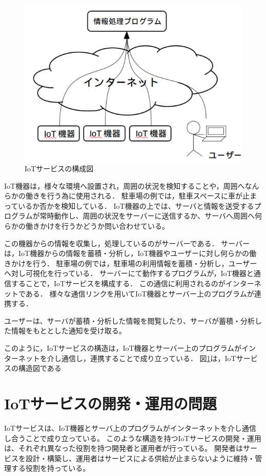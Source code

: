 \begin{figure}[htbp]
\includegraphics[width=14cm]{images/IoTservice.png}
\caption{IoTサービスの構成図}
\label{fig:IoTservice}
\end{figure}

IoT機器は，様々な環境へ設置され，周囲の状況を検知することや，周囲へなんらかの働きを行う為に使用される．
駐車場の例では，駐車スペースに車が止まっているか否かを検知している．
IoT機器の上では、サーバと情報を送受するプログラムが常時動作し、周囲の状況をサーバーに送信するか、サーバへ周囲へ何らかの働きかけを行うかどうか問い合わせている。
\medskip

この機器からの情報を収集し，処理しているのがサーバーである．
サーバーは，IoT機器からの情報を蓄積・分析し，IoT機器やユーザーに対し何らかの働きかけを行う．
駐車場の例では，駐車場の利用情報を蓄積・分析し，ユーザーへ対し可視化を行っている．
サーバーにて動作するプログラムが，IoT機器と通信することで，IoTサービスを構成する．
この通信に利用されるのがインターネットである．
様々な通信リンクを用いてIoT機器とサーバー上のプログラムが連携する．
\medskip


ユーザーは、サーバが蓄積・分析した情報を閲覧したり、サーバが蓄積・分析した情報をもととした通知を受け取る。

このように，IoTサービスの構造は，IoT機器とサーバー上のプログラムがインターネットを介し通信し，連携することで成り立っている．
図\ref{fig:IoTservice}は，IoTサービスの構造図である



\section{IoTサービスの開発・運用の問題}
IoTサービスは、IoT機器とサーバ上のプログラムがインターネットを介し通信し合うことで成り立っている。
このような構造を持つIoTサービスの開発・運用は、それぞれ異なった役割を持つ開発者と運用者が行っている。
開発者はサービスを設計・構築し、運用者はサービスによる供給が止まらないように維持・管理する役割を持っている。

